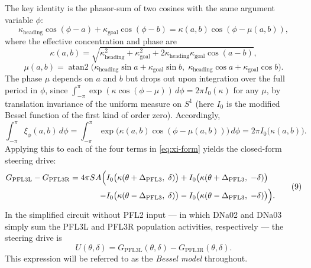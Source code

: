\documentclass[11pt, a4paper]{article}
\newcommand{\kh}{\kappa_{\mathrm{heading}}}
\newcommand{\kg}{\kappa_{\mathrm{goal}}}
\newcommand{\Dp}{\Delta_{\mathrm{PFL3}}}
\begin{document}
The key identity is the phasor-sum of two cosines with the same argument
variable $\phi$:
%
\begin{equation}
\label{eq:phasor}
\kh\cos(\phi - a) + \kg\cos(\phi - b) = \kappa(a, b)\cos(\phi - \mu(a,b)),
\end{equation}
%
where the effective concentration and phase are
%
\begin{equation}
\label{eq:kappa}
\kappa(a, b)
  = \sqrt{\kh^2 + \kg^2 + 2\kh\kg\cos(a - b)},
\end{equation}
%
\begin{equation}
\label{eq:mu}
\mu(a, b)
  = \operatorname{atan2}\bigl(
      \kh\sin a + \kg\sin b,\;
      \kh\cos a + \kg\cos b
    \bigr).
\end{equation}
%
The phase $\mu$ depends on $a$ and $b$ but drops out upon integration over the
full period in $\phi$, since $\int_{-\pi}^{\pi} \exp(\kappa\cos(\phi -
\mu))\,d\phi = 2\pi I_0(\kappa)$ for any $\mu$, by translation invariance of
the uniform measure on $S^1$ (here $I_0$ is the modified Bessel function of the
first kind of order zero).  Accordingly,
%
\begin{equation}
\label{eq:bessel-integral}
\int_{-\pi}^{\pi} \xi_\phi(a, b)\,d\phi
  = \int_{-\pi}^{\pi} \exp\bigl(\kappa(a,b)\cos(\phi - \mu(a,b))\bigr)\,d\phi
  = 2\pi I_0\bigl(\kappa(a, b)\bigr).
\tag{8}
\end{equation}
%
Applying this to each of the four terms in \cref{eq:xi-form} yields the
closed-form steering drive:
%
\begin{equation}
\label{eq:G-closed}
\begin{aligned}
G_{\mathrm{PFL3L}} - G_{\mathrm{PFL3R}}
  = 4\pi SA \Bigl(
    &I_0\bigl(\kappa(\theta + \Dp,\; \delta)\bigr)
   + I_0\bigl(\kappa(\theta + \Dp,\; -\delta)\bigr) \\
   -&I_0\bigl(\kappa(\theta - \Dp,\; \delta)\bigr)
   - I_0\bigl(\kappa(\theta - \Dp,\; -\delta)\bigr)
  \Bigr).
\end{aligned}
\tag{9}
\end{equation}
%
In the simplified circuit without PFL2 input --- in which DNa02 and DNa03
simply sum the PFL3L and PFL3R population activities, respectively --- the
steering drive is
%
\begin{equation}
\label{eq:U-bessel}
U(\theta, \delta) = G_{\mathrm{PFL3L}}(\theta,\delta) - G_{\mathrm{PFL3R}}(\theta,\delta).
\tag{10}
\end{equation}
%
This expression will be referred to as the \emph{Bessel model} throughout.
\end{document}
